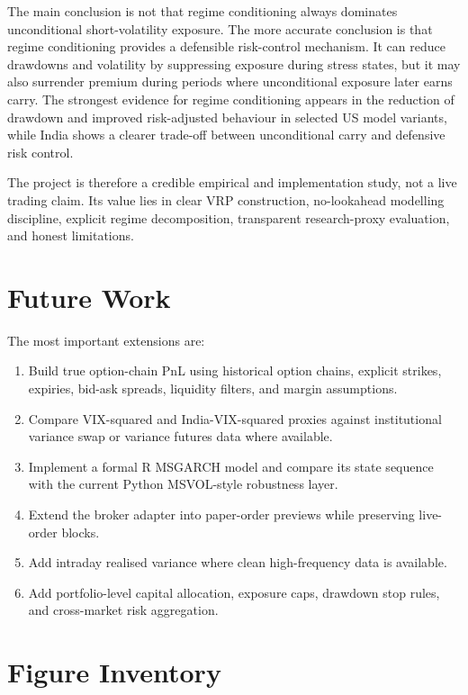 \documentclass[11pt,a4paper]{article}
\begin{document}
The main conclusion is not that regime conditioning always dominates unconditional short-volatility exposure. The more accurate conclusion is that regime conditioning provides a defensible risk-control mechanism. It can reduce drawdowns and volatility by suppressing exposure during stress states, but it may also surrender premium during periods where unconditional exposure later earns carry. The strongest evidence for regime conditioning appears in the reduction of drawdown and improved risk-adjusted behaviour in selected US model variants, while India shows a clearer trade-off between unconditional carry and defensive risk control.

The project is therefore a credible empirical and implementation study, not a live trading claim. Its value lies in clear VRP construction, no-lookahead modelling discipline, explicit regime decomposition, transparent research-proxy evaluation, and honest limitations.

\section{Future Work}

The most important extensions are:

\begin{enumerate}
    \item Build true option-chain PnL using historical option chains, explicit strikes, expiries, bid-ask spreads, liquidity filters, and margin assumptions.
    \item Compare VIX-squared and India-VIX-squared proxies against institutional variance swap or variance futures data where available.
    \item Implement a formal R MSGARCH model and compare its state sequence with the current Python MSVOL-style robustness layer.
    \item Extend the broker adapter into paper-order previews while preserving live-order blocks.
    \item Add intraday realised variance where clean high-frequency data is available.
    \item Add portfolio-level capital allocation, exposure caps, drawdown stop rules, and cross-market risk aggregation.
\end{enumerate}

\newpage
\appendix
\section{Figure Inventory}
\end{document}
